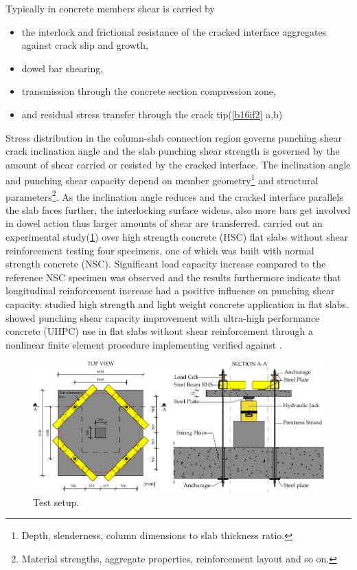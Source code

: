 \documentclass[twocolumn]{article} %
\begin{document}
Typically in concrete members shear is carried by \begin{itemize}\item the interlock and frictional resistance of the cracked interface aggregates against crack slip and growth\citep{walraven1981}, \item dowel bar shearing\citep{dei1987,dei1992,ince2007,paulay1974,taylor1970}, \item transmission through the concrete section compression zone\citep{chana1987}, \item and residual stress transfer through the crack tip(\ref{b16if2} a,b)
\end{itemize}
Stress distribution in the column-slab connection region governs punching shear crack inclination angle and the slab punching shear strength is governed by the amount of shear carried or resisted by the cracked interface. The inclination angle and punching shear capacity depend on member geometry\footnote{Depth, slenderness, column dimensions to slab thickness ratio.} and structural parameters\footnote{Material strengths, aggregate properties, reinforcement layout and so on.}. As the inclination angle reduces and the cracked interface parallels the slab faces further, the interlocking surface widens, also more bars get involved in dowel action thus larger amounts of shear are transferred. \cite{inacio2015} carried out an experimental study(\ref{i2015f1}) over high strength concrete (HSC) flat slabs without shear reinforcement testing four specimens, one of which was built with normal strength concrete (NSC). Significant load capacity increase compared to the reference NSC specimen was observed and the results furthermore indicate that longitudinal reinforcement increase had a positive influence on punching shear capacity\citep{inacio2015}. \cite{emam1997seismic,marzouk2001cyclic} studied high strength and light weight concrete application in flat slabs. \cite{kadhim2021} showed punching shear capacity improvement with ultra-high performance concrete (UHPC) use in flat slabs without shear reinforcement through a nonlinear finite element procedure implementing \cite{abaqus} verified against \cite{saleem2011,zohrevand2015punching}. 
\begin{figure}\centering
    \includegraphics[width=\columnwidth]{Figures/i2015f1.pdf}\caption{Test setup\citep{inacio2015}.}\label{i2015f1}
    \end{figure}
    
\end{document}
